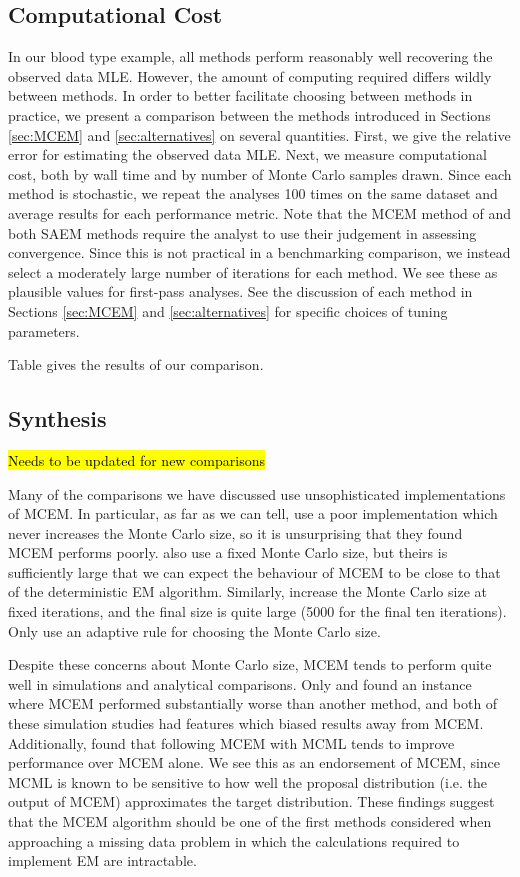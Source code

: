 \documentclass[11pt, oneside]{article}   	%
\begin{document}
\subsection{Computational Cost}
In our blood type example, all methods perform reasonably well recovering the observed data MLE. However, the amount of computing required differs wildly between methods. In order to better facilitate choosing between methods in practice, we present a comparison between the methods introduced in Sections \ref{sec:MCEM} and \ref{sec:alternatives} on several quantities. First, we give the relative error for estimating the observed data MLE. Next, we measure computational cost, both by wall time and by number of Monte Carlo samples drawn. Since each method is stochastic, we repeat the analyses 100 times on the same dataset and average results for each performance metric. Note that the MCEM method of \citet{Wei90} and both SAEM methods require the analyst to use their judgement in assessing convergence. Since this is not practical in a benchmarking comparison, we instead select a moderately large number of iterations for each method. We see these as plausible values for first-pass analyses. See the discussion of each method in Sections \ref{sec:MCEM} and \ref{sec:alternatives} for specific choices of tuning parameters.

Table  gives the results of our comparison.


\subsection{Synthesis}

\hl{Needs to be updated for new comparisons}

Many of the comparisons we have discussed \citep{McC97, Gu98I,Jan03} use unsophisticated implementations of MCEM. In particular, as far as we can tell, \citet{Gu98I} use a poor implementation which never increases the Monte Carlo size, so it is unsurprising that they found MCEM performs poorly. \citet{Jan03} also use a fixed Monte Carlo size, but theirs is sufficiently large that we can expect the behaviour of MCEM to be close to that of the deterministic EM algorithm. Similarly, \citet{McC97} increase the Monte Carlo size at fixed iterations, and the final size is quite large (5000 for the final ten iterations). Only \citet{Boo99} use an adaptive rule for choosing the Monte Carlo size.

Despite these concerns about Monte Carlo size, MCEM tends to perform quite well in simulations and analytical comparisons. Only \citet{Gu98I} and \citet{Boo01} found an instance where MCEM performed substantially worse than another method, and both of these simulation studies had features which biased results away from MCEM. Additionally, \citep{McC97} found that following MCEM with MCML tends to improve performance over MCEM alone. We see this as an endorsement of MCEM, since MCML is known to be sensitive to how well the proposal distribution (i.e. the output of MCEM) approximates the target distribution. These findings suggest that the MCEM algorithm should be one of the first methods considered when approaching a missing data problem in which the calculations required to implement EM are intractable.
\end{document}
